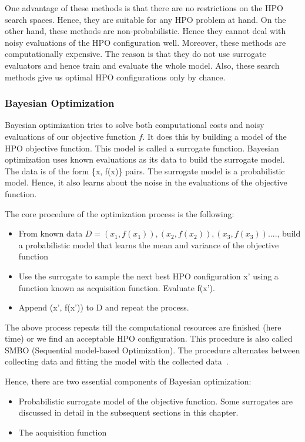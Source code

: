 \documentclass[12pt, twoside, ngerman]{report}
\begin{document}
One advantage of these methods is that there are no restrictions on the HPO search spaces. Hence, they are suitable for any HPO problem at hand.
On the other hand, these methods are non-probabilistic.
Hence they cannot deal with noisy evaluations of the HPO configuration well.
Moreover, these methods are computationally expensive. The reason is that they do not use surrogate evaluators and hence train and evaluate the whole model.
Also, these search methods give us optimal HPO configurations only by chance.
\subsubsection{Bayesian Optimization}

Bayesian optimization tries to solve both computational costs and noisy evaluations of our objective function $f$.
It does this by building a model of the HPO objective function. This model is called a surrogate function.
Bayesian optimization uses known evaluations as its data to build the surrogate model. The data is of the form \{x, f(x)\} pairs.
The surrogate model is a probabilistic model. Hence, it also learns about the noise in the evaluations of the objective function.

The core procedure of the optimization process is the following:
\begin{itemize}
\item From known data $D = {(x_1, f(x_1)), (x_2, f(x_2)), (x_3, f(x_3)) .... }$, build a probabilistic model that learns the mean and variance of the objective function
\item Use the surrogate to sample the next best HPO configuration x' using a function known as acquisition function. Evaluate f(x').
\item Append (x', f(x')) to D and repeat the process.
\end{itemize}

The above process repeats till the computational resources are finished (here time) or we find an acceptable HPO configuration.
This procedure is also called SMBO (Sequential model-based Optimization).
The procedure alternates between collecting data and fitting the model with the 
collected data~\cite{SMBOPaper}.

Hence, there are two essential components of Bayesian optimization:

\begin{itemize}
\item Probabilistic surrogate model of the objective function.  Some surrogates are discussed in detail in the subsequent sections in this chapter.
\item The acquisition function
\end{itemize}
\end{document}
